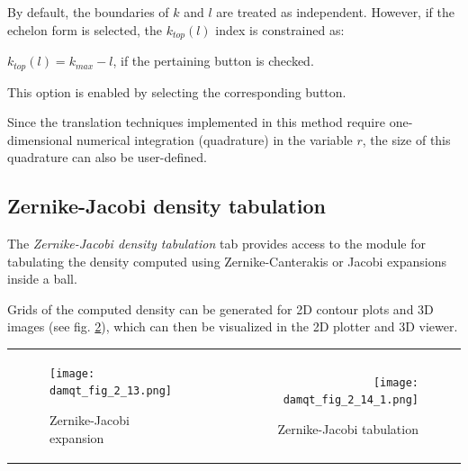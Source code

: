 \documentclass[10pt]{article}
\begin{document}
By default, the boundaries of $k$ and $l$ are treated as independent.
However, if the echelon form is selected, the $k_{top}(l)$ index is constrained as:

$k_{top}(l) = k_{max} - l$, if the pertaining button is checked.

This option is enabled by selecting the corresponding button.

Since the translation techniques implemented in this method
require one-dimensional numerical integration (quadrature) in the variable $r$,
the size of this quadrature can also be user-defined.


\subsection{Zernike-Jacobi density tabulation\label{sec:2.14}}

The {\it Zernike-Jacobi density tabulation} tab provides access to the module
for tabulating the density computed using Zernike-Canterakis or Jacobi expansions inside a ball.

Grids of the computed density can be generated for 2D contour plots
and 3D images (see fig. \ref{fig:2_14_1}),
which can then be visualized in the 2D plotter and 3D viewer.


\begin{tabular}{lr}
\begin{minipage}{.5\linewidth}
\vspace*{-15mm}
\begin{figure}[H]
\begin{center}
\vspace*{4cm}
\texttt{[image: damqt\_fig\_2\_13.png]}
\end{center}
\vspace*{2.4cm}
\caption{{Zernike-Jacobi expansion}\label{fig:2_13}}
\end{figure}
\end{minipage}
&
\begin{minipage}{.5\linewidth}
\begin{figure}[H]
\begin{center}
\vspace*{0mm}
\texttt{[image: damqt\_fig\_2\_14\_1.png]}
\end{center}
\vspace*{0cm}
\caption{{Zernike-Jacobi tabulation}\label{fig:2_14_1}}
\end{figure}
\end{minipage}
\end{tabular}
\vspace*{1cm}
\end{document}
